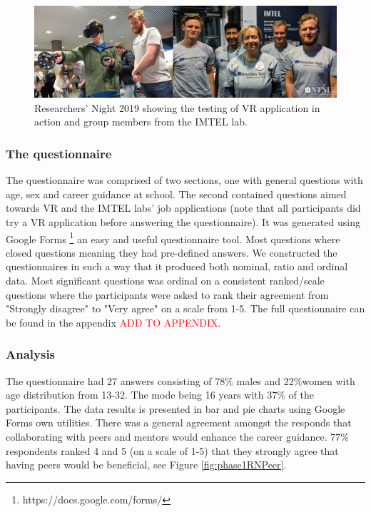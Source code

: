 \begin{figure}[!h]
    \centering
    \captionsetup{width=.8\linewidth}
    \includegraphics[width=.9\textwidth]{./fig/phase_1/researcherNight/RN_group.jpg}
    \caption{Researchers' Night 2019 showing the testing of VR application in action and group members from the IMTEL lab.}
    \label{fig:phase1RNGroup}
\end{figure}


\subsubsection{The questionnaire}
The questionnaire was comprised of two sections, one with general questions with age, sex and career guidance at school. The second contained questions aimed towards VR and the IMTEL labs' job applications (note that all participants did try a VR application before answering the questionnaire). It was generated using Google Forms \footnote{https://docs.google.com/forms/} an easy and useful questionnaire tool. Most questions where closed questions meaning they had pre-defined answers. We constructed the questionnaires in such a way that it produced both nominal, ratio and ordinal data. Most significant questions was ordinal on a consistent ranked/scale questions where the participants were asked to rank their agreement from  "Strongly disagree" to "Very agree" on a scale from 1-5. 
The full questionnaire can be found in the appendix \textcolor{red}{ADD TO APPENDIX}. 

\subsubsection{Analysis}
The questionnaire had 27 answers consisting of 78\% males and 22\%women with age distribution from 13-32. The mode being 16 years with 37\% of the participants. The data results is presented in bar and pie charts using Google Forms own utilities. There was a general agreement amongst the responds that collaborating with peers and mentors would enhance the career guidance. 77\% respondents ranked 4 and 5 (on a scale of 1-5) that they strongly agree that having peers would be beneficial, see Figure \ref{fig:phase1RNPeer}.    

